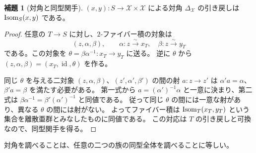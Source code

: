 \documentclass[dvipdfmx,a4paper,11pt]{article}
\theoremstyle{definition}
\newtheorem{lem}[thm]{補題}
\newcommand{\id}{\operatorname{id}}
\begin{document}
\begin{lem}[対角と同型関手]\label{lem:diagonal}
$(x,y):S\to\mathcal X\times\mathcal X$ による対角 $\Delta_{\mathcal X}$ の引き戻しは $\operatorname{Isom}_S(x,y)$ である。
\end{lem}
\begin{proof}
任意の $T\to S$ に対し、$2$-ファイバー積の対象は
\[
(z,\alpha,\beta),\qquad
\alpha:z\xrightarrow{\sim}x_T,\quad
\beta:z\xrightarrow{\sim}y_T
\]
である。この対象を $\theta=\beta\alpha^{-1}:x_T\to y_T$ に送る。
逆に $\theta$ から $(z,\alpha,\beta)=(x_T,\id,\theta)$ を作る。

同じ $\theta$ を与える二対象 $(z,\alpha,\beta)$、$(z',\alpha',\beta')$ の間の射 $a:z\to z'$ は
$\alpha'a=\alpha$、$\beta'a=\beta$ を満たす必要がある。
第一式から $a=(\alpha')^{-1}\alpha$ と一意に決まり、第二式は $\beta\alpha^{-1}=\beta'(\alpha')^{-1}$ と同値である。
従って同じ $\theta$ の間には一意な射があり、異なる $\theta$ の間には射がない。
よってファイバー積は $\operatorname{Isom}_T(x_T,y_T)$ という集合を離散亜群とみなしたものに同値である。
この対応は $T$ の引き戻しと可換なので、同型関手を得る。
\end{proof}
対角を調べることは、任意の二つの族の同型全体を調べることに等しい。
\end{document}
